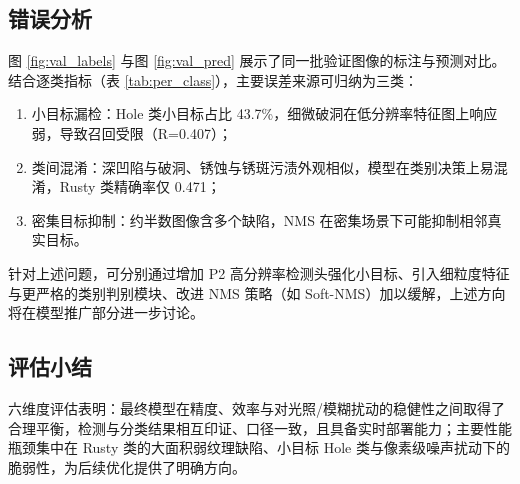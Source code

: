 \subsection{错误分析}

图 \ref{fig:val_labels} 与图 \ref{fig:val_pred} 展示了同一批验证图像的标注与预测对比。结合逐类指标（表 \ref{tab:per_class}），主要误差来源可归纳为三类：

\begin{enumerate}[leftmargin=2.2em,itemsep=2pt]
  \item {\heiti 小目标漏检：}Hole 类小目标占比 43.7\%，细微破洞在低分辨率特征图上响应弱，导致召回受限（R=0.407）；
  \item {\heiti 类间混淆：}深凹陷与破洞、锈蚀与锈斑污渍外观相似，模型在类别决策上易混淆，Rusty 类精确率仅 0.471；
  \item {\heiti 密集目标抑制：}约半数图像含多个缺陷，NMS 在密集场景下可能抑制相邻真实目标。
\end{enumerate}

针对上述问题，可分别通过增加 P2 高分辨率检测头强化小目标、引入细粒度特征与更严格的类别判别模块、改进 NMS 策略（如 Soft-NMS）加以缓解，上述方向将在模型推广部分进一步讨论。

\subsection{评估小结}

六维度评估表明：最终模型在精度、效率与对光照/模糊扰动的稳健性之间取得了合理平衡，检测与分类结果相互印证、口径一致，且具备实时部署能力；主要性能瓶颈集中在 Rusty 类的大面积弱纹理缺陷、小目标 Hole 类与像素级噪声扰动下的脆弱性，为后续优化提供了明确方向。
